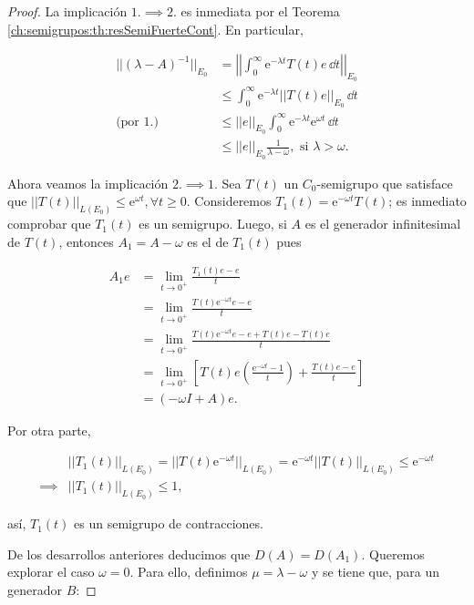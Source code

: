 \begin{proof}
    La implicación $1. \implies 2.$ es inmediata por el Teorema \ref{ch:semigrupos:th:resSemiFuerteCont}. En particular,

    \begin{align*}
        ||(\lambda -A)^{-1}||_{E_0} &= \left | \left | \int_0^{\infty}\mathrm{e}^{-\lambda t}T(t)e \, \dd t \right | \right |_{E_0}\\
        &\leq \int_0^\infty \mathrm{e}^{-\lambda t} ||T(t)e||_{E_0} \, \dd t\\
        \text{(por }1.\text{)}&\leq||e||_{E_0}\int_0^\infty \mathrm{e}^{-\lambda t} \mathrm{e}^{\omega t} \, \dd t\\
        &\leq ||e||_{E_0} \frac{1}{\lambda - \omega}, \text{ si } \lambda > \omega.
    \end{align*}

    Ahora veamos la implicación $2. \implies 1.$ Sea $T(t)$ un $C_0$-semigrupo que satisface que $||T(t)||_{L(E_0)} \leq \mathrm{e}^{\omega t}, \forall t \geq 0$. Consideremos $T_1(t) = \mathrm{e}^{-\omega t}T(t)$; es inmediato comprobar que $T_1(t)$ es un semigrupo. Luego, si $A$ es el generador infinitesimal de $T(t)$, entonces $A_1 = A - \omega$ es el de $T_1(t)$ pues

    \begin{align*}
        A_1 e &= \lim_{t \rightarrow 0^+} \frac{T_1(t)e - e}{t}\\
        &= \lim_{t \rightarrow 0^+} \frac{T(t)\mathrm{e}^{-\omega t} e - e}{t}\\
        &= \lim_{t \rightarrow 0^+}\frac{T(t)\mathrm{e}^{-\omega t}e - e + T(t)e - T(t)e}{t}\\
        &= \lim_{t \rightarrow 0^+} \left [ T(t)e \left (\frac{\mathrm{e}^{-\omega t} - 1}{t} \right) + \frac{T(t)e - e}{t} \right ]\\
        &= (-\omega I + A)e.
    \end{align*}

    Por otra parte,

    \begin{align*}
        &||T_1(t)||_{L(E_0)} = ||T(t) \mathrm{e}^{-\omega t}||_{L(E_0)} = \mathrm{e}^{-\omega t} ||T(t)||_{L(E_0)} \leq \mathrm{e}^{-\omega t}\\
        \implies& ||T_1(t)||_{L(E_0)} \leq 1,
    \end{align*}

    así, $T_1(t)$ es un semigrupo de contracciones.

    De los desarrollos anteriores deducimos que $D(A) = D(A_1)$. Queremos explorar el caso $\omega = 0$. Para ello, definimos $\mu = \lambda - \omega$ y se tiene que, para un generador $B$:


\end{proof}

